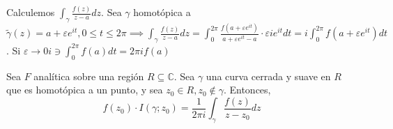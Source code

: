\begin{ejemplo}
\begin{cajita}
\begin{ejemplo}
\begin{figure}[H]
            \end{figure}
        \end{ejemplo}
    \end{cajita}
\end{ejemplo}

\begin{dem}
    Calculemos $\int_\gamma \frac{f(z)}{z-a}dz$. Sea $\gamma$ homotópica a $\tilde{\gamma}(z)=a+\varepsilon e^{it},0\leq t\leq 2\pi \implies \int_\gamma \frac{f(z)}{z-a}dz=\int_0^{2\pi}\frac{f(a+\varepsilon e^{it})}{a+\varepsilon e^{it}-a}\cdot\varepsilon ie^{it}dt=i\int_0^{2\pi}f(a+\varepsilon e^{it})dt$. Si $\varepsilon\to 0 i\ni \int_0^{2\pi}f(a)dt = 2\pi i f(a)$
\end{dem}

\begin{teorema}
    Sea $F$ analítica sobre una región $R\subseteq \mathbb{C}$. Sea $\gamma$ una curva cerrada y suave en $R$ que es homotópica a un punto, y sea $z_0\in R, z_0\not\in \gamma$. Entonces, 
    $$f(z_0)\cdot I(\gamma;z_0)=\frac{1}{2\pi i}\int_\gamma \frac{f(z)}{z-z_0}dz$$ 
\end{teorema}

